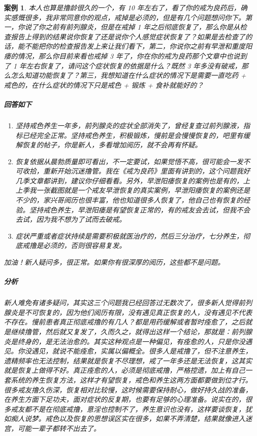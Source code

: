 \documentclass{ctexart}
\newtheorem{case}{案例}
\begin{document}
\begin{case}
    本人也算是撸龄很久的一个，有 10 年左右了，看了你的戒为良药后，确实感慨很多，我非常同意你的观点，戒掉是必须的，但是有几个问题想问你下。第一，你说了你之前有前列腺炎，但是在戒掉 1 年之后彻底恢复了，那么你是从检查报告上得到的结果说你恢复了还是说你个人感觉症状恢复了？如果是去检查了的话，能不能把你的检查报告发上来让我们看下，第二，你说你之前有早泄和重度阳痿的情况，那么你目前来看也戒掉 3 年了，你在你的戒为良药那个文章中也说到了 1 年左右恢复了，请问这个症状恢复的依据是什么？既然 3 年多没有破戒，那么怎么知道功能恢复了？第三，我想知道在什么症状的情况下是需要一直吃药 + 戒色的，在什么症状的情况下只是戒色 + 锻炼 + 食补就能好的？
    \subparagraph{回答如下} \begin{enumerate}
        \item 坚持戒色养生一年多，前列腺炎的症状全部消失了，曾经复查过前列腺液，指标已经完全正常。坚持戒色养生，积极锻炼，慢前是会慢慢恢复的，吧里有缓解恢复的帖子，你是新人，多看增加阅历，就不会再有怀疑。
        \item 恢复依据从晨勃质量即可看出，不一定要试，如果觉悟不高，很可能会一发不可收拾，重新开始沉迷撸管。我在《戒为良药》里面有讲到的，这个问题我好几季文章都讲到，建议你仔细看看。另外，早泄阳痿恢复的案例也是有的，上上季我一张截图就是一个戒友早泄恢复的真实案例，早泄阳痿恢复的案例还是不少的，家兴哥阅历也很丰富，他也知道很多人恢复了，他自己也有恢复的经验。坚持戒色养生，早泄阳痿是有望恢复正常的，有的戒友会去试，但我不会去试，因为我不想为了试而去破戒。
        \item 症状严重或者症状持续是需要积极就医治疗的，然后三分治疗，七分养生，彻底戒撸是必须的，否则很容易复发。
    \end{enumerate}
    加油！新人疑问多，很正常。如果你有很深厚的阅历，这些都不是问题。
    \subparagraph{分析} 新人难免有诸多疑问，其实这三个问题我已经回答过无数次了，很多新人觉得前列腺炎是不可恢复的，因为他们阅历有限，没有遇见真正恢复的人，没有遇见不代表不存在。慢前患者真正彻底戒撸的有几人？都是用药缓解或者暂时痊愈了，之后就是继续撸管，然后就又复发了，久而久之，就得出这样一个结论，那就是：前列腺炎是终身的，是无法治愈的。其实这种观点是一种偏见，有痊愈的人，只是你没遇见。你没遇见，就说不能痊愈，实属以偏概全。很多人是戒撸了，但不注意养生，遗精频率也无法控制，结果就是恢复不尽理想，戒了一年多还是无法恢复，这其实就是恢复上做得不好。真正痊愈的人，必须是彻底戒撸，严格控遗，加上有自己一套系统的养生恢复方法，这样才有望恢复，戒色和养生这两方面都要做到位才行。很多戒友撸久伤深，恢复相对比较慢，这时候需要保持耐心，做好持久战的准备，在养生方面下足功夫，面对症状的反复期，也要有足够的心理准备。说实在的，很多戒友都不是在彻底戒撸，意淫也控制不了，养生意识也没有，这样要谈恢复，犹如痴人说梦。戒色以及恢复的思想误区实在很多，如果不弄清楚，结果就像进入迷宫，可能一辈子都转不出去了。\\

\end{case}
\end{document}
